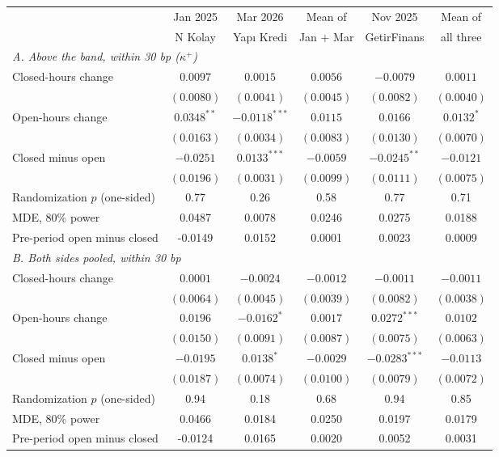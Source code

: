 \begin{tabular}{lccccc}
\toprule
 & Jan 2025 & Mar 2026 & Mean of & Nov 2025 & Mean of \\
 & N Kolay & Yap\i{} Kredi & Jan + Mar & GetirFinans & all three \\
\midrule
\multicolumn{6}{l}{\emph{A. Above the band, within 30 bp ($\kappa^+$)}} \\
Closed-hours change & $0.0097$ & $0.0015$ & $0.0056$ & $-0.0079$ & $0.0011$ \\
 & $(0.0080)$ & $(0.0041)$ & $(0.0045)$ & $(0.0082)$ & $(0.0040)$ \\
Open-hours change & $0.0348^{**}$ & $-0.0118^{***}$ & $0.0115$ & $0.0166$ & $0.0132^{*}$ \\
 & $(0.0163)$ & $(0.0034)$ & $(0.0083)$ & $(0.0130)$ & $(0.0070)$ \\
Closed minus open & $-0.0251$ & $0.0133^{***}$ & $-0.0059$ & $-0.0245^{**}$ & $-0.0121$ \\
 & $(0.0196)$ & $(0.0031)$ & $(0.0099)$ & $(0.0111)$ & $(0.0075)$ \\
\quad Randomization $p$ (one-sided) & 0.77 & 0.26 & 0.58 & 0.77 & 0.71 \\
\quad MDE, 80\% power & 0.0487 & 0.0078 & 0.0246 & 0.0275 & 0.0188 \\
\quad Pre-period open minus closed & -0.0149 & 0.0152 & 0.0001 & 0.0023 & 0.0009 \\
\multicolumn{6}{l}{\emph{B. Both sides pooled, within 30 bp}} \\
Closed-hours change & $0.0001$ & $-0.0024$ & $-0.0012$ & $-0.0011$ & $-0.0011$ \\
 & $(0.0064)$ & $(0.0045)$ & $(0.0039)$ & $(0.0082)$ & $(0.0038)$ \\
Open-hours change & $0.0196$ & $-0.0162^{*}$ & $0.0017$ & $0.0272^{***}$ & $0.0102$ \\
 & $(0.0150)$ & $(0.0091)$ & $(0.0087)$ & $(0.0075)$ & $(0.0063)$ \\
Closed minus open & $-0.0195$ & $0.0138^{*}$ & $-0.0029$ & $-0.0283^{***}$ & $-0.0113$ \\
 & $(0.0187)$ & $(0.0074)$ & $(0.0100)$ & $(0.0079)$ & $(0.0072)$ \\
\quad Randomization $p$ (one-sided) & 0.94 & 0.18 & 0.68 & 0.94 & 0.85 \\
\quad MDE, 80\% power & 0.0466 & 0.0184 & 0.0250 & 0.0197 & 0.0179 \\
\quad Pre-period open minus closed & -0.0124 & 0.0165 & 0.0020 & 0.0052 & 0.0031 \\

\end{tabular}
